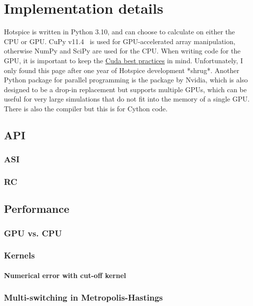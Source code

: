 \section{Implementation details}
Hotspice is written in Python 3.10, and can choose to calculate on either the CPU or GPU.
CuPy v11.4~\cite{CuPy} is used for GPU-accelerated array manipulation, otherwise NumPy and SciPy are used for the CPU.
When writing code for the GPU, it is important to keep the \href{https://docs.nvidia.com/cuda/cuda-c-best-practices-guide/index.html}{Cuda best practices} in mind.
Unfortunately, I only found this page after one year of Hotspice development *shrug*.
Another Python package for parallel programming is the  package by Nvidia, which is also designed to be a drop-in  replacement but supports multiple GPUs, which can be useful for very large simulations that do not fit into the memory of a single GPU.
There is also the  compiler but this is for Cython code. \par
\subsection{API} %
\subsubsection{ASI}
\subsubsection{RC}
\subsection{Performance} %
\subsubsection{GPU vs. CPU}
\subsubsection{Kernels} %
\paragraph{Numerical error with cut-off kernel}
\subsubsection{Multi-switching in Metropolis-Hastings}
